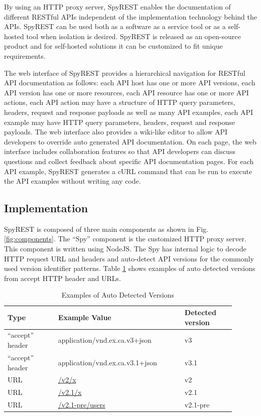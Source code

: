 By using an HTTP proxy server, SpyREST enables the documentation of different RESTful APIs independent of the implementation technology behind the APIs. SpyREST can be used both as a software as a service tool or as a self-hosted tool when isolation is desired. SpyREST is released as an open-source product and for self-hosted solutions it can be customized to fit unique requirements.


The web interface of SpyREST provides a hierarchical navigation for RESTful API documentation as follows: each API host has one or more API versions, each API version has one or more resources, each API resource has one or more API actions, each API action may have a structure of HTTP query parameters, headers, request and response payloads as well as many API examples, each API example may have HTTP query parameters, headers, request and response payloads. The web interface also provides a wiki-like editor to allow API developers to override auto generated API documentation. On each page, the web interface includes collaboration features so that API developers can discuss questions and collect feedback about specific API documentation pages. For each API example, SpyREST generates a cURL command that can be run to execute the API examples without writing any code.


\subsection{Implementation} %
\label{sub:implementation}

SpyREST is composed of three main components as shown in Fig. \ref{fig:components}. The ``Spy'' component is the customized HTTP proxy server. This component is written using NodeJS. The Spy has internal logic to decode HTTP request URL and headers and auto-detect API versions for the commonly used version identifier patterns. Table \ref{table:versions} shows examples of auto detected versions from accept HTTP header and URLs.

\begin{table}[!tbh]
  \caption{Examples of Auto Detected Versions}
  \begin{tabular}{|p{0.2\linewidth}|p{0.5\linewidth}|p{0.2\linewidth}|}
    \hline
    \textbf{Type} & \textbf{Example Value} & \textbf{Detected version}\\
    \hline
    ``accept'' header & application/vnd.ex.ca.v3+json & v3\\
    \hline
    ``accept'' header & application/vnd.ex.ca.v3.1+json & v3.1\\
    \hline
    URL & \url{/v2/x} & v2\\
    \hline
    URL & \url{/v2.1/x} & v2.1\\
    \hline
    URL & \url{/v2.1-pre/users} & v2.1-pre\\
    \hline
  \end{tabular}
  \label{table:versions}
\end{table}

